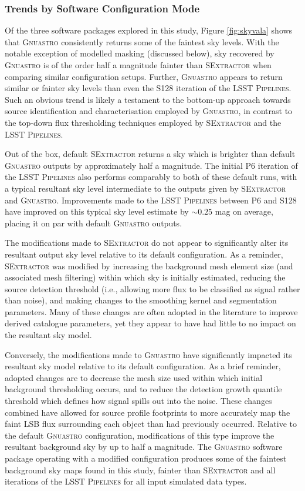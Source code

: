 \documentclass[fleqn,usenatbib,useAMS]{mnras}
\newcommand*{\about}{\mathord\sim}
\newcommand*{\SExtractor}{\textsc{SExtractor}\xspace}
\newcommand*{\Gnuastro}{\textsc{Gnuastro}\xspace}
\newcommand*{\LSSTPs}{\textsc{LSST Pipelines}\xspace}
\newcommand*{\DMA}{\textsc{P6}\xspace}
\newcommand*{\DMB}{\textsc{S128}\xspace}
\begin{document}
\subsubsection{Trends by Software Configuration Mode}
\label{sec:mode}

Of the three software packages explored in this study, Figure \ref{fig:skyvala} shows that \Gnuastro consistently returns some of the faintest sky levels. With the notable exception of modelled masking (discussed below), sky recovered by \Gnuastro is of the order half a magnitude fainter than \SExtractor when comparing similar configuration setups. Further, \Gnuastro appears to return similar or fainter sky levels than even the \DMB iteration of the \LSSTPs. Such an obvious trend is likely a testament to the bottom-up approach towards source identification and characterisation employed by \Gnuastro, in contrast to the top-down flux thresholding techniques employed by \SExtractor and the \LSSTPs. 

Out of the box, default \SExtractor returns a sky which is brighter than default \Gnuastro outputs by approximately half a magnitude. The initial \DMA iteration of the \LSSTPs also performs comparably to both of these default runs, with a typical resultant sky level intermediate to the outputs given by \SExtractor and \Gnuastro. Improvements made to the \LSSTPs between \DMA and \DMB have improved on this typical sky level estimate by $\about0.25$ mag on average, placing it on par with default \Gnuastro outputs. 

The modifications made to \SExtractor do not appear to significantly alter its resultant output sky level relative to its default configuration. As a reminder, \SExtractor was modified by increasing the background mesh element size (and associated mesh filtering) within which sky is initially estimated, reducing the source detection threshold (i.e., allowing more flux to be classified as signal rather than noise), and making changes to the smoothing kernel and segmentation parameters. Many of these changes are often adopted in the literature to improve derived catalogue parameters, yet they appear to have had little to no impact on the resultant sky model. 

Conversely, the modifications made to \Gnuastro have significantly impacted its resultant sky model relative to its default configuration. As a brief reminder, adopted changes are to decrease the mesh size used within which initial background thresholding occurs, and to reduce the detection growth quantile threshold which defines how signal spills out into the noise. These changes combined have allowed for source profile footprints to more accurately map the faint LSB flux surrounding each object than had previously occurred. Relative to the default \Gnuastro configuration, modifications of this type improve the resultant background sky by up to half a magnitude. The \Gnuastro software package operating with a modified configuration produces some of the faintest background sky maps found in this study, fainter than \SExtractor and all iterations of the \LSSTPs for all input simulated data types. 
\end{document}

